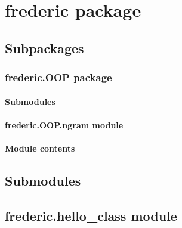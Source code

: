 \documentclass[letterpaper,10pt,english]{sphinxmanual}
\begin{document}
\section{frederic package}
\label{\detokenize{frederic:frederic-package}}\label{\detokenize{frederic::doc}}

\subsection{Subpackages}
\label{\detokenize{frederic:subpackages}}

\subsubsection{frederic.OOP package}
\label{\detokenize{frederic.OOP:frederic-oop-package}}\label{\detokenize{frederic.OOP::doc}}

\paragraph{Submodules}
\label{\detokenize{frederic.OOP:submodules}}

\paragraph{frederic.OOP.ngram module}
\label{\detokenize{frederic.OOP:frederic-oop-ngram-module}}

\paragraph{Module contents}
\label{\detokenize{frederic.OOP:module-frederic.OOP}}\label{\detokenize{frederic.OOP:module-contents}}

\subsection{Submodules}
\label{\detokenize{frederic:submodules}}

\subsection{frederic.hello\_class module}
\label{\detokenize{frederic:module-frederic.hello_class}}\label{\detokenize{frederic:frederic-hello-class-module}}
\end{document}
